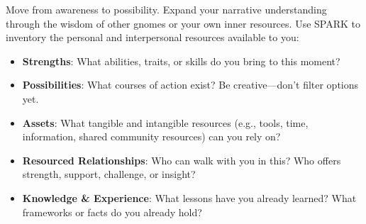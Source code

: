 \documentclass{article}
\begin{document}
Move from awareness to possibility. Expand your narrative understanding through the wisdom of other gnomes or your own inner resources. Use SPARK to inventory the personal and interpersonal resources available to you:
\begin{itemize}[noitemsep,topsep=0pt]
    \item \textbf{Strengths}: What abilities, traits, or skills do you bring to this moment?
    \item \textbf{Possibilities}: What courses of action exist? Be creative—don't filter options yet.
    \item \textbf{Assets}: What tangible and intangible resources (e.g., tools, time, information, shared community resources) can you rely on?
    \item \textbf{Resourced Relationships}: Who can walk with you in this? Who offers strength, support, challenge, or insight?
    \item \textbf{Knowledge \& Experience}: What lessons have you already learned? What frameworks or facts do you already hold?
\end{itemize}
\end{document}
